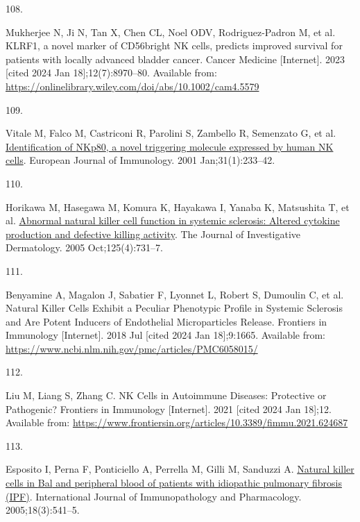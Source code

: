 \documentclass[
]{article}
\newlength{\cslhangindent}
\newlength{\csllabelwidth}
\newenvironment{CSLReferences}[2] %
 {\begin{list}{}{%
  \setlength{\itemindent}{0pt}
  \setlength{\leftmargin}{0pt}
  \setlength{\parsep}{0pt}
  \ifodd #1
   \setlength{\leftmargin}{\cslhangindent}
   \setlength{\itemindent}{-1\cslhangindent}
  \fi
  \setlength{\itemsep}{#2\baselineskip}}}
 {\end{list}}
\newcommand{\CSLLeftMargin}[1]{\parbox[t]{\csllabelwidth}{\strut#1\strut}}
\newcommand{\CSLRightInline}[1]{\parbox[t]{\linewidth - \csllabelwidth}{\strut#1\strut}}
\begin{document}
\begin{CSLReferences}{0}{1}
\CSLLeftMargin{108. }%
\CSLRightInline{Mukherjee N, Ji N, Tan X, Chen CL, Noel ODV, Rodriguez-Padron M, et al. {KLRF1}, a novel marker of {CD56bright} {NK} cells, predicts improved survival for patients with locally advanced bladder cancer. Cancer Medicine {[}Internet{]}. 2023 {[}cited 2024 Jan 18{]};12(7):8970--80. Available from: \url{https://onlinelibrary.wiley.com/doi/abs/10.1002/cam4.5579}}

\CSLLeftMargin{109. }%
\CSLRightInline{Vitale M, Falco M, Castriconi R, Parolini S, Zambello R, Semenzato G, et al. \href{https://doi.org/10.1002/1521-4141(200101)31:1\%3C233::AID-IMMU233\%3E3.0.CO;2-4}{Identification of {NKp80}, a novel triggering molecule expressed by human {NK} cells}. European Journal of Immunology. 2001 Jan;31(1):233--42. }

\CSLLeftMargin{110. }%
\CSLRightInline{Horikawa M, Hasegawa M, Komura K, Hayakawa I, Yanaba K, Matsushita T, et al. \href{https://doi.org/10.1111/j.0022-202X.2005.23767.x}{Abnormal natural killer cell function in systemic sclerosis: Altered cytokine production and defective killing activity}. The Journal of Investigative Dermatology. 2005 Oct;125(4):731--7. }

\CSLLeftMargin{111. }%
\CSLRightInline{Benyamine A, Magalon J, Sabatier F, Lyonnet L, Robert S, Dumoulin C, et al. Natural {Killer} {Cells} {Exhibit} a {Peculiar} {Phenotypic} {Profile} in {Systemic} {Sclerosis} and {Are} {Potent} {Inducers} of {Endothelial} {Microparticles} {Release}. Frontiers in Immunology {[}Internet{]}. 2018 Jul {[}cited 2024 Jan 18{]};9:1665. Available from: \url{https://www.ncbi.nlm.nih.gov/pmc/articles/PMC6058015/}}

\CSLLeftMargin{112. }%
\CSLRightInline{Liu M, Liang S, Zhang C. {NK} {Cells} in {Autoimmune} {Diseases}: {Protective} or {Pathogenic}? Frontiers in Immunology {[}Internet{]}. 2021 {[}cited 2024 Jan 18{]};12. Available from: \url{https://www.frontiersin.org/articles/10.3389/fimmu.2021.624687}}

\CSLLeftMargin{113. }%
\CSLRightInline{Esposito I, Perna F, Ponticiello A, Perrella M, Gilli M, Sanduzzi A. \href{https://doi.org/10.1177/039463200501800314}{Natural killer cells in {Bal} and peripheral blood of patients with idiopathic pulmonary fibrosis ({IPF})}. International Journal of Immunopathology and Pharmacology. 2005;18(3):541--5. }


\end{CSLReferences}
\end{document}
